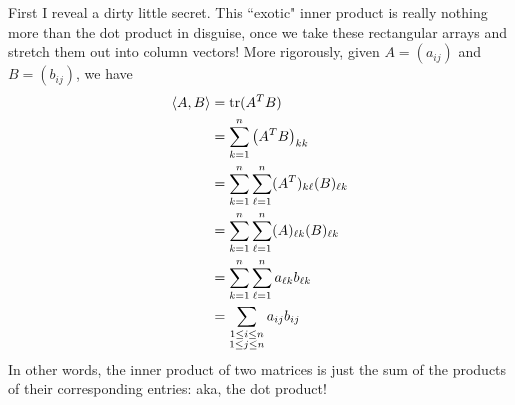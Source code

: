 \ee
\begin{solution}
\noindent First I reveal a dirty little secret. This ``exotic"  inner product is really nothing more than the dot product in disguise, once we take these rectangular arrays and stretch them out into column vectors! More rigorously, given $A=(a_{ij})$ and $B=(b_{ij})$, we have 
\begin{align*}
\langle A,B\rangle&=\operatorname{tr}(A^TB)\\
&=\sum_{k=1}^n \left(A^TB\right)_{kk}\\
&=\sum_{k=1}^n \sum_{\ell=1}^n (A^T)_{k\ell}(B)_{\ell k}\\
&=\sum_{k=1}^n \sum_{\ell=1}^n (A)_{\ell k}(B)_{\ell k}\\
&=\sum_{k=1}^n \sum_{\ell=1}^n a_{\ell k}b_{\ell k}\\
&=\sum_{\substack{1\leq i\leq n\\ 1\leq j\leq n}} a_{ij}b_{ij}
\end{align*}
In other words, the inner product of two matrices is just the sum of the products of their corresponding entries: aka, the dot product! 


\end{solution}
